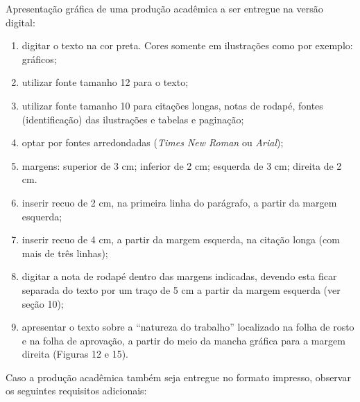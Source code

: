 Apresentação gráfica de uma produção acadêmica a ser entregue na versão digital:

\begin{enumerate}[label=\alph*)]
   \item digitar o texto na cor preta. Cores somente em ilustrações como por exemplo: gráficos;
    \item  utilizar fonte tamanho 12 para o texto;
    \item  utilizar fonte tamanho 10 para citações longas, notas de rodapé, fontes (identificação) das ilustrações e tabelas e paginação;
    \item  optar por fontes arredondadas (\textit{Times New Roman} ou \textit{Arial}); 
    \item  margens:  superior de 3 cm;  inferior de 2 cm;  esquerda de 3 cm; direita de 2 cm.
    \item  inserir recuo de 2 cm, na primeira linha do parágrafo, a partir da margem esquerda;
    \item  inserir recuo de 4 cm, a partir da margem esquerda, na citação longa (com mais de três linhas);
    \item  digitar a nota de rodapé dentro das margens indicadas, devendo esta ficar separada do texto por um traço de 5 cm a partir da margem esquerda (ver seção 10);
    \item  apresentar o texto sobre a “natureza do trabalho” localizado  na folha de rosto e na folha de aprovação, a partir do meio da mancha gráfica para a margem direita (Figuras 12 e 15).
\end{enumerate}


Caso a produção acadêmica também seja entregue no formato impresso, observar os seguintes requisitos adicionais:

